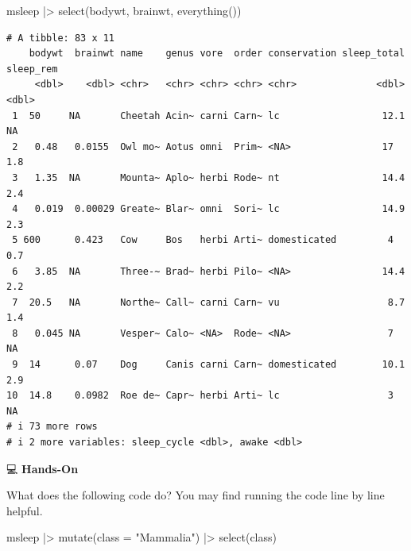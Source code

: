 \documentclass[
  letterpaper,
  DIV=11,
  numbers=noendperiod]{scrreprt}
\newenvironment{Shaded}{\begin{snugshade}}{\end{snugshade}}
\newcommand{\AttributeTok}[1]{\textcolor[rgb]{0.40,0.45,0.13}{#1}}
\newcommand{\FunctionTok}[1]{\textcolor[rgb]{0.28,0.35,0.67}{#1}}
\newcommand{\NormalTok}[1]{\textcolor[rgb]{0.00,0.23,0.31}{#1}}
\newcommand{\SpecialCharTok}[1]{\textcolor[rgb]{0.37,0.37,0.37}{#1}}
\newcommand{\StringTok}[1]{\textcolor[rgb]{0.13,0.47,0.30}{#1}}
\begin{document}
\begin{tcolorbox}[enhanced jigsaw, colbacktitle=quarto-callout-tip-color!10!white, opacitybacktitle=0.6, breakable, left=2mm, leftrule=.75mm, toprule=.15mm, toptitle=1mm, bottomtitle=1mm, colframe=quarto-callout-tip-color-frame, opacityback=0, coltitle=black, arc=.35mm, titlerule=0mm, colback=white, bottomrule=.15mm, title=\textcolor{quarto-callout-tip-color}{\faLightbulb}\hspace{0.5em}{Answer}, rightrule=.15mm]

\begin{Shaded}
\begin{Highlighting}[]
\NormalTok{msleep }\SpecialCharTok{|\textgreater{}}
  \FunctionTok{select}\NormalTok{(bodywt, brainwt, }\FunctionTok{everything}\NormalTok{())}
\end{Highlighting}
\end{Shaded}

\begin{verbatim}
# A tibble: 83 x 11
    bodywt  brainwt name    genus vore  order conservation sleep_total sleep_rem
     <dbl>    <dbl> <chr>   <chr> <chr> <chr> <chr>              <dbl>     <dbl>
 1  50     NA       Cheetah Acin~ carni Carn~ lc                  12.1      NA  
 2   0.48   0.0155  Owl mo~ Aotus omni  Prim~ <NA>                17         1.8
 3   1.35  NA       Mounta~ Aplo~ herbi Rode~ nt                  14.4       2.4
 4   0.019  0.00029 Greate~ Blar~ omni  Sori~ lc                  14.9       2.3
 5 600      0.423   Cow     Bos   herbi Arti~ domesticated         4         0.7
 6   3.85  NA       Three-~ Brad~ herbi Pilo~ <NA>                14.4       2.2
 7  20.5   NA       Northe~ Call~ carni Carn~ vu                   8.7       1.4
 8   0.045 NA       Vesper~ Calo~ <NA>  Rode~ <NA>                 7        NA  
 9  14      0.07    Dog     Canis carni Carn~ domesticated        10.1       2.9
10  14.8    0.0982  Roe de~ Capr~ herbi Arti~ lc                   3        NA  
# i 73 more rows
# i 2 more variables: sleep_cycle <dbl>, awake <dbl>
\end{verbatim}

\end{tcolorbox}

💻 \textbf{Hands-On}

What does the following code do? You may find running the code line by
line helpful.

\begin{Shaded}
\begin{Highlighting}[]
\NormalTok{msleep }\SpecialCharTok{|\textgreater{}}
  \FunctionTok{mutate}\NormalTok{(}\AttributeTok{class =} \StringTok{"Mammalia"}\NormalTok{) }\SpecialCharTok{|\textgreater{}}
  \FunctionTok{select}\NormalTok{(class)}
\end{Highlighting}
\end{Shaded}
\end{document}
